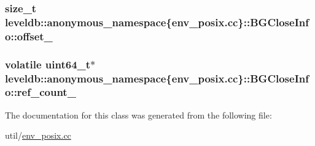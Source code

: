 \subsubsection[{offset\+\_\+}]{\setlength{\rightskip}{0pt plus 5cm}size\+\_\+t leveldb\+::anonymous\+\_\+namespace\{env\+\_\+posix.\+cc\}\+::B\+G\+Close\+Info\+::offset\+\_\+}\label{classleveldb_1_1anonymous__namespace_02env__posix_8cc_03_1_1_b_g_close_info_a0a7b348e33e44bb2a891d7f60a15d819}
\hypertarget{classleveldb_1_1anonymous__namespace_02env__posix_8cc_03_1_1_b_g_close_info_a1eb11395e6609f849369b1fae4d31b55}{}
\subsubsection[{ref\+\_\+count\+\_\+}]{\setlength{\rightskip}{0pt plus 5cm}volatile {\bf uint64\+\_\+t}$\ast$ leveldb\+::anonymous\+\_\+namespace\{env\+\_\+posix.\+cc\}\+::B\+G\+Close\+Info\+::ref\+\_\+count\+\_\+}\label{classleveldb_1_1anonymous__namespace_02env__posix_8cc_03_1_1_b_g_close_info_a1eb11395e6609f849369b1fae4d31b55}


The documentation for this class was generated from the following file\+:\begin{DoxyCompactItemize}
\item 
util/\hyperlink{env__posix_8cc}{env\+\_\+posix.\+cc}\end{DoxyCompactItemize}
